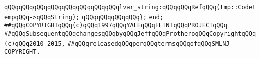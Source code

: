 \verb|qQQqqQQqqQQqqQQqqQQqqQQqqQQqqQQqlvar_string:qQQqqQQqRefqQQq(tmp::CodetempqQQq->qQQqString);|\newline
\verb|qQQqqQQqqQQqqQQq};|\newline
\verb|end;|\newline
\newline
\verb|##qQQqCOPYRIGHTqQQq(c)qQQq1997qQQqYALEqQQqFLINTqQQqPROJECTqQQq|\newline
\verb|##qQQqSubsequentqQQqchangesqQQqbyqQQqJeffqQQqProtheroqQQqCopyrightqQQq(c)qQQq2010-2015,|\newline
\verb|##qQQqreleasedqQQqperqQQqtermsqQQqofqQQqSMLNJ-COPYRIGHT.|\newline

